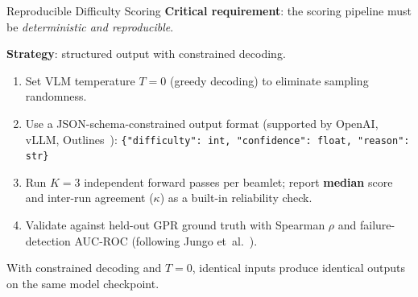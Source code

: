 \documentclass[aspectratio=169, 10pt]{beamer}
\begin{document}
\begin{frame}{Reproducible Difficulty Scoring}
  \textbf{Critical requirement}: the scoring pipeline must be
  \emph{deterministic and reproducible}.

  \vspace{6pt}
  \textbf{Strategy}: structured output with constrained decoding.

  \vspace{4pt}
  \begin{enumerate}
    \item Set VLM temperature $T = 0$ (greedy decoding) to eliminate
          sampling randomness.
    \item Use a JSON-schema-constrained output format
          (supported by OpenAI, vLLM, Outlines~\cite{willard2023}):
          \vspace{2pt}
          {\small\texttt{\{"difficulty": int, "confidence": float,
          "reason": str\}}}
    \item Run $K{=}3$ independent forward passes per beamlet;
          report \textbf{median} score and inter-run agreement
          ($\kappa$) as a built-in reliability check.
    \item Validate against held-out GPR ground truth with
          Spearman $\rho$ and failure-detection AUC-ROC
          (following Jungo et~al.~\cite{jungo2020}).
  \end{enumerate}

  \vspace{4pt}
  {\small With constrained decoding and $T{=}0$, identical inputs
  produce identical outputs on the same model checkpoint.}
\end{frame}
\end{document}
